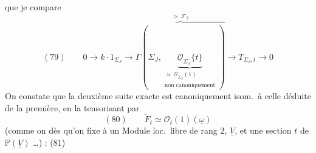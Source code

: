 \documentclass[11pt,a4paper]{article}
\begin{document}
que  je compare 
\[
  (79) \qquad 0 \to k \cdot 1_{\Sigma_J} \to
  \overbrace{\Gamma(\Sigma_J, \underbrace{\underline{\mathcal{O}}_{\Sigma_J}\{t\}}_{\substack{\simeq\, \underline{\mathcal{O}}_{\Sigma_J}(1) \\ \text{non canoniquement}}})}^{\dot\simeq\, \mathcal{F}_2}
  \to T_{\Sigma_J, t} \to 0
\]
On constate que la deuxième suite exacte est canoniquement isom.\ à celle
déduite de la première, en la tensorisant par
\[
  (80) \qquad \check F_t \simeq \mathcal{O}_t(1)(\underline{\omega})
\]
(comme on   \ill{} dès qu'on fixe \ill{} à un Module
loc.\ libre de rang $2$, $\underline{V}$, \struck{\ill{}} et une section $t$ de
$\mathbb{P}(\underline{V})$ \ldots) :
(81)


\end{document}
